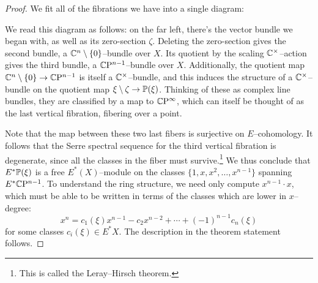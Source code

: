 \begin{proof}
We fit all of the fibrations we have into a single diagram:
\begin{center}
\end{center}
We read this diagram as follows: on the far left, there's the vector bundle we began with, as well as its zero-section $\zeta$.  Deleting the zero-section gives the second bundle, a $\C^n \setminus \{0\}$--bundle over $X$.  Its quotient by the scaling $\C^\times$--action gives the third bundle, a $\CP^{n-1}$--bundle over $X$.  Additionally, the quotient map $\C^n \setminus \{0\} \to \CP^{n-1}$ is itself a $\C^\times$--bundle, and this induces the structure of a $\C^\times$--bundle on the quotient map $\xi \setminus \zeta \to \P(\xi)$.  Thinking of these as complex line bundles, they are classified by a map to $\CP^\infty$, which can itself be thought of as the last vertical fibration, fibering over a point.

Note that the map between these two last fibers is surjective on $E$--cohomology.  It follows that the Serre spectral sequence for the third vertical fibration is degenerate, since all the classes in the fiber must survive.\footnote{This is called the Leray--Hirsch theorem.}  We thus conclude that $E^* \P(\xi)$ is a free $E^*(X)$--module on the classes $\{1, x, x^2, \ldots, x^{n-1}\}$ spanning $E^* \CP^{n-1}$.  To understand the ring structure, we need only compute $x^{n-1} \cdot x$, which must be able to be written in terms of the classes which are lower in $x$--degree: \[x^n = c_1(\xi) x^{n-1} - c_2 x^{n-2} + \cdots + (-1)^{n-1} c_n(\xi)\] for some classes $c_i(\xi) \in E^* X$.  The description in the theorem statement follows.
\end{proof}


